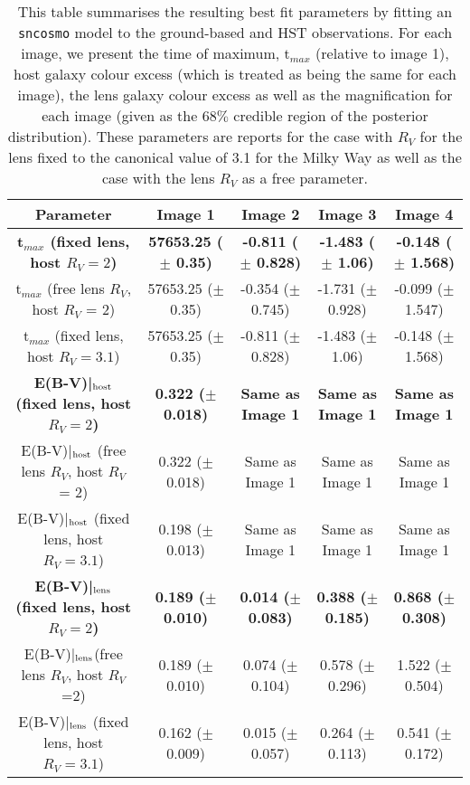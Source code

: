  \begin{table*}
\centering
\caption{This table summarises the resulting best fit parameters by fitting an \texttt{sncosmo} model to the ground-based and HST observations. For each image, we present the time of maximum, t$_{max}$ (relative to image 1), host galaxy colour excess (which is treated as being the same for each image), the lens galaxy colour excess as well as the magnification for each image (given as the 68$\%$ credible region of the posterior distribution). These parameters are reports for the case with $R_V$ for the lens fixed to the canonical value of 3.1 for the Milky Way as well as the case with the lens $R_V$ as a free parameter.}
\begin{tabular}{|c|c|c|c|c|}
\hline
Parameter & Image 1 & Image 2 &  Image 3 & Image 4 \\
\hline\hline
 {\bf t$_{max}$ (fixed lens, host $R_V = 2$)} & {\bf 57653.25 ($\pm$ 0.35)} & {\bf -0.811 ($\pm$  0.828)} & {\bf -1.483  ($\pm$ 1.06)} & {\bf -0.148 ($\pm$ 1.568)} \\
t$_{max}$ (free lens $R_V$, host $R_V$ = 2) &  57653.25 ($\pm$ 0.35) & -0.354 ($\pm$  0.745) & -1.731  ($\pm$ 0.928) & -0.099 ($\pm$ 1.547) \\
t$_{max}$ (fixed lens, host $R_V = 3.1$) &  57653.25 ($\pm$ 0.35) & -0.811 ($\pm$  0.828) & -1.483  ($\pm$ 1.06) & -0.148 ($\pm$ 1.568) \\


{\bf E(B-V)|$_{\rm host}$ (fixed lens, host $R_V = 2$)}   &  {\bf 0.322 ($\pm$ 0.018)} &   {\bf Same as Image 1} & {\bf Same as Image 1} & {\bf Same as Image 1}  \\
E(B-V)|$_{\rm host}$  (free lens $R_V$, host $R_V$ = 2) & 0.322 ($\pm$ 0.018) & Same as Image 1 & Same as Image 1 & Same as Image 1  \\
E(B-V)|$_{\rm host}$  (fixed lens, host $R_V = 3.1$)& 0.198 ($\pm$ 0.013) & Same as Image 1 & Same as Image 1 & Same as Image 1  \\

{\bf E(B-V)|$_{\rm lens}$(fixed lens, host $R_V = 2$)}  &  {\bf 0.189 ($\pm$ 0.010)} &  {\bf 0.014 ($\pm$ 0.083)} & {\bf 0.388 ($\pm$ 0.185)} & {\bf 0.868 ($\pm$ 0.308)} \\

E(B-V)|$_{\rm lens}$(free lens $R_V$, host $R_V$=2)  &  0.189 ($\pm$ 0.010) &  0.074 ($\pm$ 0.104) & 0.578 ($\pm$ 0.296) & 1.522 ($\pm$ 0.504) \\
E(B-V)|$_{\rm lens}$ (fixed lens, host $R_V = 3.1$)  &  0.162 ($\pm$ 0.009) &  0.015 ($\pm$ 0.057) & 0.264 ($\pm$ 0.113) & 0.541 ($\pm$ 0.172) \\


\end{tabular}
\end{table*}
